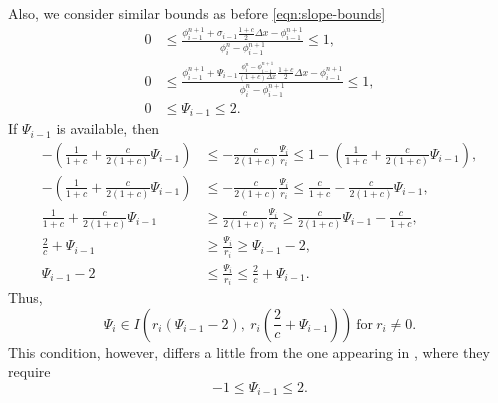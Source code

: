 \documentclass[../thesis.tex]{subfiles}
\begin{document}
\begin{remark}
\begin{equation}
\end{equation}
Also, we consider similar bounds as before \eqref{eqn:slope-bounds}
\begin{equation}
    \begin{split}\label{eqn: Frolkovic - psi bounds}
        0
        &\leq
        \frac{\phi_{i-1}^{n+1}
        +\sigma_{i-1}\frac{1+c}{2}\Delta x
        - \phi_{i-1}^{n+1}}{\phi_{i}^{n} - \phi_{i-1}^{n+1}}
        \leq
        1,
        \\
        0
        &\leq
        \frac{\phi_{i-1}^{n+1}
        +\Psi_{i-1}
        \frac{\phi_{i}^{n}-\phi_{i-1}^{n+1}}
        {(1+c)\Delta x}\frac{1+c}{2}\Delta x
        - \phi_{i-1}^{n+1}}{\phi_{i}^{n} - \phi_{i-1}^{n+1}}
        \leq
        1,
        \\
        0
        &\leq
        \Psi_{i-1}
        \leq
        2.
    \end{split}
\end{equation}
If \(\Psi_{i-1}\) is available, then
\begin{equation}
    \begin{split}
        -\left(
            \frac{1}{1+c} + \frac{c}{2(1+c)}\Psi_{i-1} \right)
        &\leq
        -\frac{c}{2(1+c)}
        \frac{\Psi_{i}}{r_{i}}
        \leq
        1-\left(
            \frac{1}{1+c} + \frac{c}{2(1+c)}\Psi_{i-1} \right),
        \\
        -\left(
            \frac{1}{1+c} + \frac{c}{2(1+c)}\Psi_{i-1} \right)
        &\leq
        -\frac{c}{2(1+c)}
        \frac{\Psi_{i}}{r_{i}}
        \leq
        \frac{c}{1+c} - \frac{c}{2(1+c)}\Psi_{i-1},
        \\
        \frac{1}{1+c} + \frac{c}{2(1+c)}\Psi_{i-1}
        &\geq
        \frac{c}{2(1+c)}
        \frac{\Psi_{i}}{r_{i}}
        \geq
        \frac{c}{2(1+c)}\Psi_{i-1} - \frac{c}{1+c},
        \\
        \frac{2}{c} + \Psi_{i-1}
        &\geq
        \frac{\Psi_{i}}{r_{i}}
        \geq
        \Psi_{i-1} - 2,
        \\
        \Psi_{i-1} - 2
        &\leq
        \frac{\Psi_{i}}{r_{i}}
        \leq
        \frac{2}{c} + \Psi_{i-1}.
    \end{split}
\end{equation}
Thus,
\begin{equation}
    \Psi_{i}
    \in
    I
    \left( r_{i}\left(\Psi_{i-1} - 2\right),
    ~r_{i}\left( \frac{2}{c} + \Psi_{i-1} \right)
    \right)\ \text{for}\ r_{i} \neq 0.
\end{equation}
This condition, however, differs a little from the one appearing in \cite{2023_Frolkovic}, where they require
\begin{equation}
    -1
    \leq
    \Psi_{i-1}
    \leq
    2.
\end{equation}


\end{remark}
\end{document}
